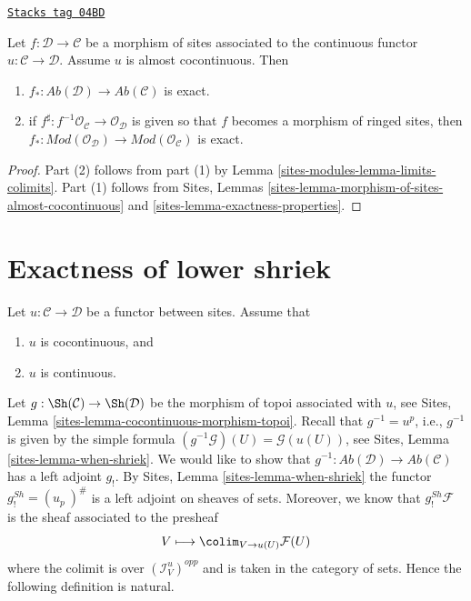 \begin{lemma}
\label{sites-modules-lemma-morphism-ringed-sites-almost-cocontinuous}
\href{https://stacks.math.columbia.edu/tag/04BD}{\texttt{Stacks tag 04BD}}

Let $f : \mathcal{D} \to \mathcal{C}$ be a morphism of sites
associated to the continuous functor $u : \mathcal{C} \to \mathcal{D}$.
Assume $u$ is almost cocontinuous. Then
\begin{enumerate}
\item $f_* : \textit{Ab}(\mathcal{D}) \to \textit{Ab}(\mathcal{C})$ is exact.
\item if $f^\sharp : f^{-1}\mathcal{O}_\mathcal{C} \to \mathcal{O}_\mathcal{D}$
is given so that $f$ becomes a morphism of ringed sites, then
$f_* : \textit{Mod}(\mathcal{O}_\mathcal{D}) \to
\textit{Mod}(\mathcal{O}_\mathcal{C})$ is exact.
\end{enumerate}
\end{lemma}

\begin{proof}
Part (2) follows from part (1) by
Lemma \ref{sites-modules-lemma-limits-colimits}.
Part (1) follows from
Sites, Lemmas
\ref{sites-lemma-morphism-of-sites-almost-cocontinuous} and
\ref{sites-lemma-exactness-properties}.
\end{proof}

\section{Exactness of lower shriek}
\label{sites-modules-section-exactness-lower-shriek}
Let $u : \mathcal{C} \to \mathcal{D}$ be a functor between sites.
Assume that
\begin{enumerate}
\item[(a)] $u$ is cocontinuous, and
\item[(b)] $u$ is continuous.
\end{enumerate}
Let $g : \Sh(\mathcal{C}) \to \Sh(\mathcal{D})$ be the
morphism of topoi associated with $u$, see
Sites, Lemma \ref{sites-lemma-cocontinuous-morphism-topoi}.
Recall that $g^{-1} = u^p$, i.e., $g^{-1}$ is given by the simple formula
$(g^{-1}\mathcal{G})(U) = \mathcal{G}(u(U))$, see
Sites, Lemma \ref{sites-lemma-when-shriek}.
We would like to show that
$g^{-1} : \textit{Ab}(\mathcal{D}) \to \textit{Ab}(\mathcal{C})$
has a left adjoint $g_!$. By
Sites, Lemma \ref{sites-lemma-when-shriek}
the functor $g^{Sh}_! = (u_p\ )^\#$ is a left adjoint on sheaves of sets.
Moreover, we know that $g^{Sh}_!\mathcal{F}$ is the sheaf
associated to the presheaf
$$
V \longmapsto \colim_{V \to u(U)} \mathcal{F}(U)
$$
where the colimit is over $(\mathcal{I}_V^u)^{opp}$ and is taken in the
category of sets. Hence the following definition is natural.

